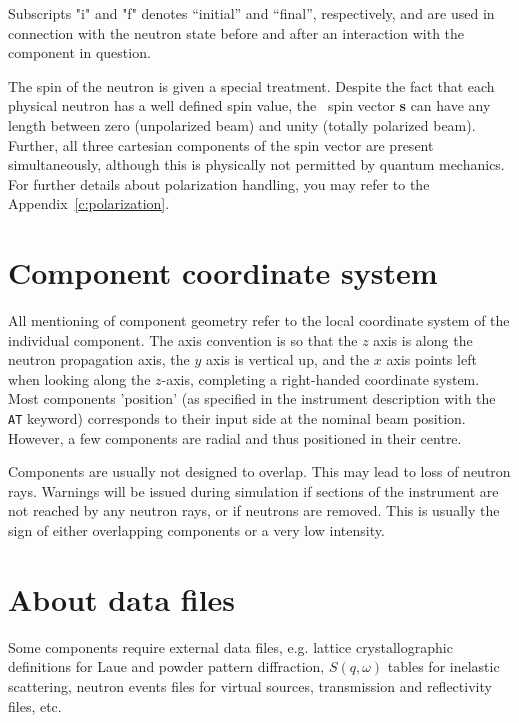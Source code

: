 Subscripts "i" and "f" denotes ``initial'' and ``final'', respectively,
and are used in connection with the neutron state before and after
an interaction with the component in question.

The spin of the neutron is given a special treatment. Despite
the fact that each physical neutron has a well defined spin value,
the \MCS\ spin vector
{\bf s} can have any length between zero (unpolarized beam) and unity
(totally polarized beam). Further, all three cartesian components of
the spin vector are present simultaneously, although this is physically
not permitted by quantum mechanics.
For further details about polarization handling, you may refer to the Appendix~\ref{c:polarization}.

\section{Component coordinate system}
All mentioning of component geometry refer to
the local coordinate system of the individual component.
The axis convention is so that the $z$ axis is along
the neutron propagation axis, the $y$ axis is vertical up,
and the $x$ axis points left when looking along the $z$-axis,
completing a right-handed coordinate system.
Most components 'position' (as specified in the instrument description
with the \verb+AT+ keyword) corresponds to their input side at the nominal
beam position.
However, a few components are radial and thus positioned in their centre.

Components are usually not designed to overlap.
This may lead to loss of neutron rays.
Warnings will be issued during simulation if sections of the instrument
are not reached by any neutron rays, or if neutrons are removed.
This is usually the sign of either overlapping components
or a very low intensity.

\section{About data files}
Some components require external data files,
e.g. lattice crystallographic definitions for Laue and powder pattern diffraction,
$S(q,\omega)$ tables for inelastic scattering,
neutron events files for virtual sources,
transmission and reflectivity files, etc.

